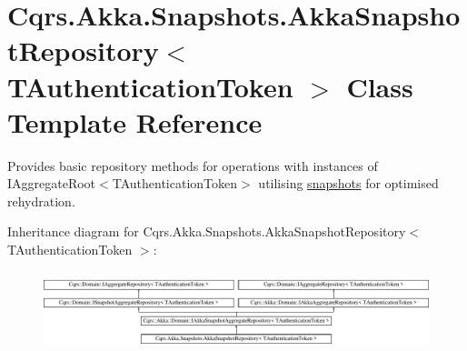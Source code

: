 \hypertarget{classCqrs_1_1Akka_1_1Snapshots_1_1AkkaSnapshotRepository}{}\section{Cqrs.\+Akka.\+Snapshots.\+Akka\+Snapshot\+Repository$<$ T\+Authentication\+Token $>$ Class Template Reference}
\label{classCqrs_1_1Akka_1_1Snapshots_1_1AkkaSnapshotRepository}


Provides basic repository methods for operations with instances of I\+Aggregate\+Root$<$\+T\+Authentication\+Token$>$ utilising \hyperlink{}{snapshots} for optimised rehydration.  


Inheritance diagram for Cqrs.\+Akka.\+Snapshots.\+Akka\+Snapshot\+Repository$<$ T\+Authentication\+Token $>$\+:\begin{figure}[H]
\begin{center}
\leavevmode
\includegraphics[height=2.328482cm]{classCqrs_1_1Akka_1_1Snapshots_1_1AkkaSnapshotRepository}
\end{center}
\end{figure}
